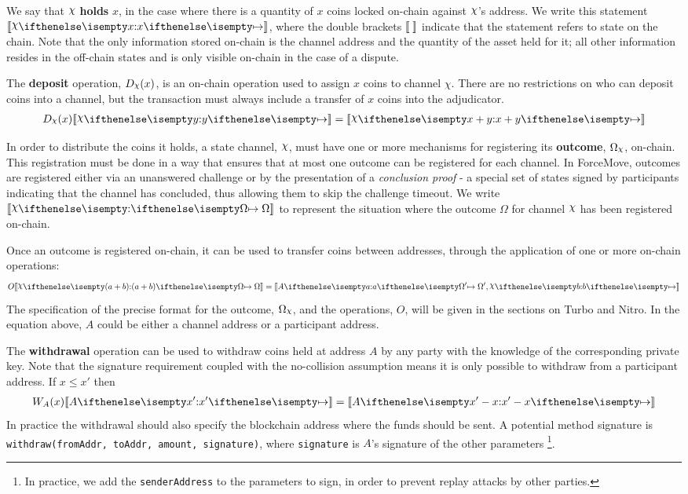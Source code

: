 \documentclass{article}
\begin{document}
We say that $\rchi$ \textbf{holds} $x$, in the case where there is a quantity of $x$ coins
locked on-chain against $\rchi$'s address.
We write this statement $\adj{\holds{\rchi}{x}{}}$,
where the double brackets $\llbracket \; \rrbracket$ indicate that the statement refers to state on the chain.
Note that the only information stored on-chain is the channel address and the quantity of the asset held for it;
all other information resides in the off-chain states and is only visible on-chain in the case of a dispute.

The \textbf{deposit} operation, $D_\rchi(x)$, is an on-chain operation used to assign $x$ coins to channel $\chi$.
There are no restrictions on who can deposit coins into a channel, but the
transaction must always include a transfer of $x$ coins into the adjudicator.
\begin{align*}
D_\rchi(x) \adj{\holds{\rchi}{y}{}} = \adj{\holds{\rchi}{x + y}{}}
\end{align*}

In order to distribute the coins it holds, a state channel, $\rchi$, must have one or more mechanisms for
registering its \textbf{outcome}, $\Omega_\rchi$, on-chain.
This registration must be done in a way that ensures that at most one outcome can be registered for each channel.
In ForceMove, outcomes are registered either via an unanswered challenge or by the presentation
of a \textit{conclusion proof} - a special set of states signed by participants indicating
that the channel has concluded, thus allowing them to skip the challenge timeout.
We write $\adj{\holds{\rchi}{}{\Omega}}$ to represent the situation where the outcome $\Omega$ for channel $\rchi$ has been registered on-chain.

Once an outcome is registered on-chain, it can be used to transfer coins between addresses,
through the application of one or more on-chain operations:
\begin{align*}
  O \adj{\holds{\rchi}{(a + b)}{\Omega}} = \adj{\holds{A}{a}{\Omega'
}, \holds{\rchi}{b}{}}
\end{align*}
The specification of the precise format for the outcome, $\Omega_\rchi$, and the operations, $O$,
will be given in the sections on Turbo and Nitro.
In the equation above, $A$ could be either a channel address or a participant address.

The \textbf{withdrawal} operation can be used to withdraw coins held at address $A$ by any
party with the knowledge of the corresponding private key. 
Note that the signature requirement coupled with the no-collision assumption means
it is only possible to withdraw from a participant address.
If $x \leq x'$ then
\begin{align*}
W_A(x) \adj{\holds{A}{x'}{}} = \adj{\holds{A}{x'-x}{}}
\end{align*}
In practice the withdrawal should also specify the blockchain address where the funds should be sent.
A potential method signature is \texttt{withdraw(fromAddr, toAddr, amount, signature)}, 
where \texttt{signature} is $A$'s signature of the other parameters
\footnote{In practice, we add the \texttt{senderAddress} to the parameters to sign,
in order to prevent replay attacks by other parties.}.
\end{document}
